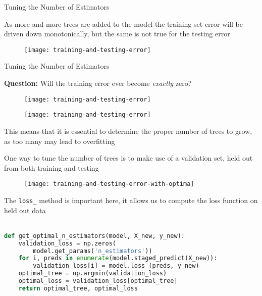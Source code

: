 %
\begin{frame}{Tuning the Number of Estimators}

As more and more trees are added to the model the training set error will be driven down monotonically, but the same is not true for the testing error

  \begin{figure}
    \texttt{[image: training-and-testing-error]}
  \end{figure}

\end{frame}
%
\begin{frame}{Tuning the Number of Estimators}

\textbf{Question:} Will the training error ever become \textit{exactly} zero?

  \begin{figure}
    \texttt{[image: training-and-testing-error]}
  \end{figure}

\end{frame}
%
\begin{frame}

  \begin{figure}
    \texttt{[image: training-and-testing-error]}
  \end{figure}

This means that it is essential to determine the proper number of trees to grow, as too many may lead to overfitting

\end{frame}
%
\begin{frame}
One way to tune the number of trees is to make use of a validation set, held out from both training and testing

  \begin{figure}
    \texttt{[image: training-and-testing-error-with-optima]}
  \end{figure}
  
\end{frame}
%
\begin{frame}[fragile]
The \texttt{loss\_} method is important here, it allows us to compute the loss function on held out data\\~\\

\begin{lstlisting}[language=python]
def get_optimal_n_estimators(model, X_new, y_new):
    validation_loss = np.zeros(
        model.get_params('n_estimators'))
    for i, preds in enumerate(model.staged_predict(X_new)):
        validation_loss[i] = model.loss_(preds, y_new)    
    optimal_tree = np.argmin(validation_loss)
    optimal_loss = validation_loss[optimal_tree]
    return optimal_tree, optimal_loss
\end{lstlisting}

\end{frame}
